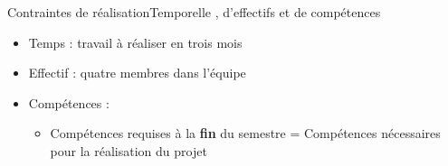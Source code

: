 \begin{frame}{Contraintes de réalisation}{Temporelle , d'effectifs et de
compétences}
\begin{itemize}
  \item Temps : travail à réaliser en trois mois
  \item Effectif : quatre membres dans l'équipe
  \item Compétences :
  \begin{itemize}
    \item Compétences requises à la \textbf {fin} du semestre \newline =
    Compétences nécessaires pour la réalisation du projet
    \end{itemize}
\end{itemize}
\end{frame}
